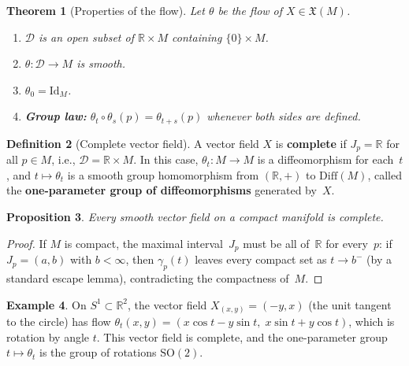 \documentclass[12pt,a4paper,openany]{book}
\newtheorem{theorem}{Theorem}[section]
\newtheorem{proposition}[theorem]{Proposition}
\theoremstyle{definition}
\newtheorem{definition}[theorem]{Definition}
\newtheorem{example}[theorem]{Example}
\theoremstyle{remark}
\newcommand{\R}{\mathbb{R}}
\newcommand{\Id}{\mathrm{Id}}
\newcommand{\SO}{\mathrm{SO}}
\newcommand{\Diff}{\mathrm{Diff}}
\begin{document}
\begin{theorem}[Properties of the flow]\label{thm:flow-props}%
Let $\theta$ be the flow of $X \in \mathfrak{X}(M)$.
\begin{enumerate}[label=(\roman*)]
  \item $\mathcal{D}$ is an open subset of $\R \times M$ containing
    $\{0\} \times M$.
  \item $\theta \colon \mathcal{D} \to M$ is smooth.
  \item $\theta_0 = \Id_M$.
  \item \textbf{Group law:} $\theta_t \circ \theta_s(p) = \theta_{t+s}(p)$
    whenever both sides are defined.
\end{enumerate}
\end{theorem}

\begin{definition}[Complete vector field]\label{def:complete-vf}%
A vector field $X$ is \textbf{complete} if $J_p = \R$ for all $p \in M$,
i.e., $\mathcal{D} = \R \times M$.  In this case, $\theta_t \colon M \to M$
is a diffeomorphism for each~$t$, and $t \mapsto \theta_t$ is a smooth
group homomorphism from $(\R, +)$ to $\Diff(M)$, called the
\textbf{one-parameter group of diffeomorphisms} generated by~$X$.
\end{definition}

\begin{proposition}\label{prop:compact-complete}%
Every smooth vector field on a compact manifold is complete.
\end{proposition}

\begin{proof}
If $M$ is compact, the maximal interval~$J_p$ must be all of~$\R$ for
every~$p$: if $J_p = (a, b)$ with $b < \infty$, then
$\gamma_p(t)$ leaves every compact set as $t \to b^-$ (by a standard
escape lemma), contradicting the compactness of~$M$.
\end{proof}

\begin{example}\label{ex:flow-rotation}%
On $S^1 \subset \R^2$, the vector field
$X_{(x,y)} = (-y, x)$ (the unit tangent to the circle) has flow
$\theta_t(x, y) = (x\cos t - y\sin t,\; x\sin t + y\cos t)$, which is
rotation by angle $t$.  This vector field is complete, and the
one-parameter group $t \mapsto \theta_t$ is the group of rotations
$\SO(2)$.
\end{example}
\end{document}
